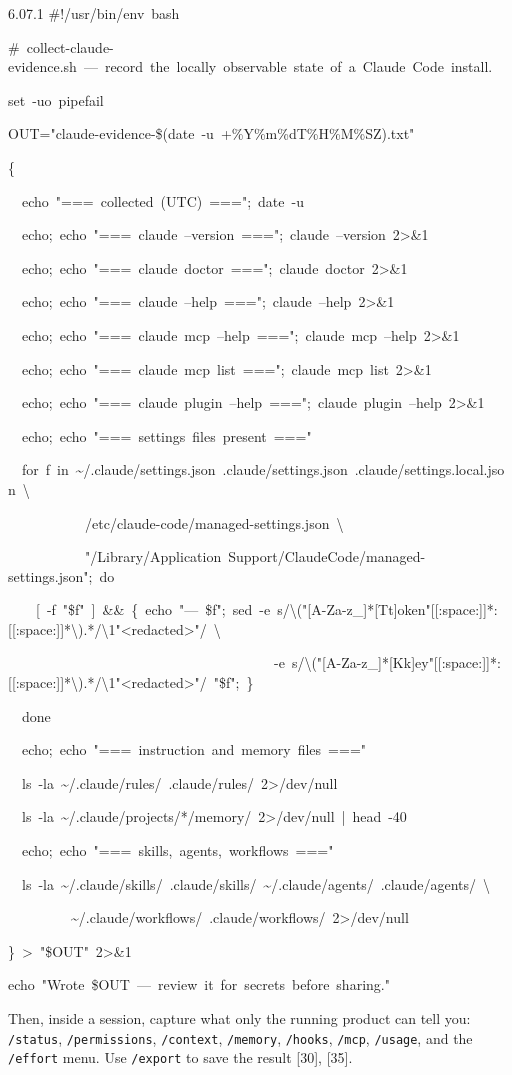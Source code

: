 \documentclass[11pt,a4paper,twoside,openany]{book}
\newcommand{\cl}[1]{\noindent\mbox{#1}\par}
\begin{document}
\begin{codeblock}{6.0}{7.1}
\cl{\#!/usr/bin/env~bash}
\cl{\#~collect-claude-evidence.sh~—~record~the~locally~observable~state~of~a~Claude~Code~install.}
\cl{set~-uo~pipefail}
\cl{OUT="claude-evidence-\$(date~-u~+\%Y\%m\%dT\%H\%M\%SZ).txt"}
\cl{\{}
\cl{~~echo~"===~collected~(UTC)~===";~date~-u}
\cl{~~echo;~echo~"===~claude~--version~===";~claude~--version~2>\&1}
\cl{~~echo;~echo~"===~claude~doctor~===";~claude~doctor~2>\&1}
\cl{~~echo;~echo~"===~claude~--help~===";~claude~--help~2>\&1}
\cl{~~echo;~echo~"===~claude~mcp~--help~===";~claude~mcp~--help~2>\&1}
\cl{~~echo;~echo~"===~claude~mcp~list~===";~claude~mcp~list~2>\&1}
\cl{~~echo;~echo~"===~claude~plugin~--help~===";~claude~plugin~--help~2>\&1}
\cl{~~echo;~echo~"===~settings~files~present~==="}
\cl{~~for~f~in~\textasciitilde{}/.claude/settings.json~.claude/settings.json~.claude/settings.local.json~\textbackslash{}}
\cl{~~~~~~~~~~~/etc/claude-code/managed-settings.json~\textbackslash{}}
\cl{~~~~~~~~~~~"/Library/Application~Support/ClaudeCode/managed-settings.json";~do}
\cl{~~~~[~-f~"\$f"~]~\&\&~\{~echo~"---~\$f";~sed~-e~\textquotesingle{}s/\textbackslash{}("[A-Za-z\_]*[Tt]oken"[[:space:]]*:[[:space:]]*\textbackslash{}).*/\textbackslash{}1"<redacted>"/\textquotesingle{}~\textbackslash{}}
\cl{~~~~~~~~~~~~~~~~~~~~~~~~~~~~~~~~~~~~~~-e~\textquotesingle{}s/\textbackslash{}("[A-Za-z\_]*[Kk]ey"[[:space:]]*:[[:space:]]*\textbackslash{}).*/\textbackslash{}1"<redacted>"/\textquotesingle{}~"\$f";~\}}
\cl{~~done}
\cl{~~echo;~echo~"===~instruction~and~memory~files~==="}
\cl{~~ls~-la~\textasciitilde{}/.claude/rules/~.claude/rules/~2>/dev/null}
\cl{~~ls~-la~\textasciitilde{}/.claude/projects/*/memory/~2>/dev/null~|~head~-40}
\cl{~~echo;~echo~"===~skills,~agents,~workflows~==="}
\cl{~~ls~-la~\textasciitilde{}/.claude/skills/~.claude/skills/~\textasciitilde{}/.claude/agents/~.claude/agents/~\textbackslash{}}
\cl{~~~~~~~~~\textasciitilde{}/.claude/workflows/~.claude/workflows/~2>/dev/null}
\cl{\}~>~"\$OUT"~2>\&1}
\cl{echo~"Wrote~\$OUT~—~review~it~for~secrets~before~sharing."}
\end{codeblock}

Then, inside a session, capture what only the running product can tell you: \texttt{/\allowbreak{}status}, \texttt{/\allowbreak{}permissions}, \texttt{/\allowbreak{}context}, \texttt{/\allowbreak{}memory}, \texttt{/\allowbreak{}hooks}, \texttt{/\allowbreak{}mcp}, \texttt{/\allowbreak{}usage}, and the \texttt{/\allowbreak{}effort} menu. Use \texttt{/\allowbreak{}export} to save the result [30], [35].
\end{document}
